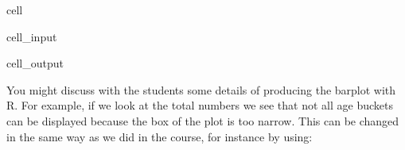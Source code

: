 \documentclass[letterpaper,10pt,english]{jupyterBook}
\begin{document}
\begin{sphinxuseclass}{cell}\begin{sphinxVerbatimInput}

\begin{sphinxuseclass}{cell_input}
\begin{sphinxVerbatim}[commandchars=\\\{\}]
\end{sphinxVerbatim}

\end{sphinxuseclass}\end{sphinxVerbatimInput}
\begin{sphinxVerbatimOutput}

\begin{sphinxuseclass}{cell_output}
\noindent{}

\end{sphinxuseclass}\end{sphinxVerbatimOutput}

\end{sphinxuseclass}
\sphinxAtStartPar
You might discuss with the students some details of producing the barplot with R. For example, if we look at the total numbers we see that not all age buckets can be displayed because the box of the plot is too narrow. This can be changed in the same way as we did in the course, for instance by using:
\end{document}
